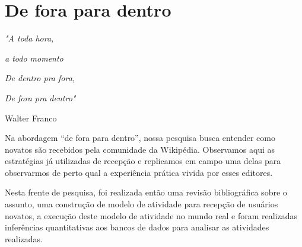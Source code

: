\chapter{De fora para dentro}

\singlespacing
\begin{flushright}
\textit{"A toda hora,}

\textit{a todo momento}

\textit{De dentro pra fora,}

\textit{De fora pra dentro"}

Walter Franco
\end{flushright}
\doublespacing

Na abordagem ``de fora para dentro'', nossa pesquisa busca entender como novatos são recebidos pela comunidade da Wikipédia. Observamos aqui as estratégias já utilizadas de recepção e replicamos em campo uma delas para observarmos de perto qual a experiência prática vivida por esses editores.

Nesta frente de pesquisa, foi realizada então uma revisão bibliográfica sobre o assunto, uma construção de modelo de atividade para recepção de usuários novatos, a execução deste modelo de atividade no mundo real e foram realizadas inferências quantitativas aos bancos de dados para analisar as atividades realizadas.



